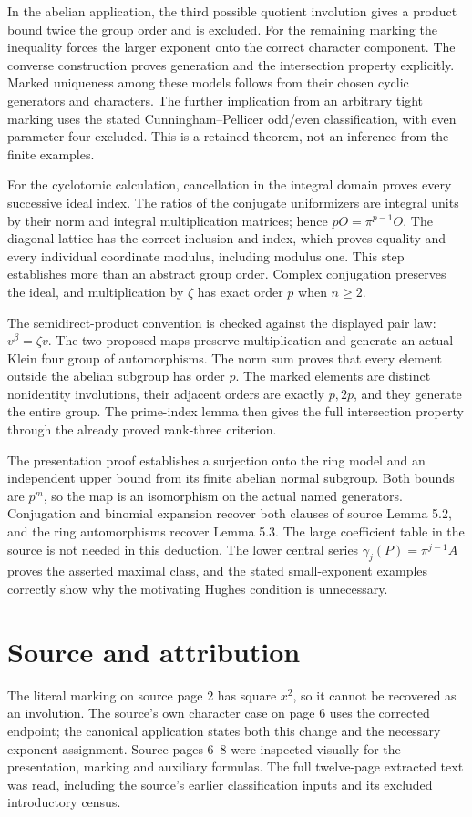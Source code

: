 \documentclass[11pt,a4paper]{article}
\begin{document}
In the abelian application, the third possible quotient involution gives a product bound twice the group order and is excluded. For the remaining marking the inequality forces the larger exponent onto the correct character component. The converse construction proves generation and the intersection property explicitly. Marked uniqueness among these models follows from their chosen cyclic generators and characters. The further implication from an arbitrary tight marking uses the stated Cunningham--Pellicer odd/even classification, with even parameter four excluded. This is a retained theorem, not an inference from the finite examples.

For the cyclotomic calculation, cancellation in the integral domain proves every successive ideal index. The ratios of the conjugate uniformizers are integral units by their norm and integral multiplication matrices; hence $pO=\pi^{p-1}O$. The diagonal lattice has the correct inclusion and index, which proves equality and every individual coordinate modulus, including modulus one. This step establishes more than an abstract group order. Complex conjugation preserves the ideal, and multiplication by $\zeta$ has exact order $p$ when $n\geq2$.

The semidirect-product convention is checked against the displayed pair law: $v^\beta=\zeta v$. The two proposed maps preserve multiplication and generate an actual Klein four group of automorphisms. The norm sum proves that every element outside the abelian subgroup has order $p$. The marked elements are distinct nonidentity involutions, their adjacent orders are exactly $p,2p$, and they generate the entire group. The prime-index lemma then gives the full intersection property through the already proved rank-three criterion.

The presentation proof establishes a surjection onto the ring model and an independent upper bound from its finite abelian normal subgroup. Both bounds are $p^m$, so the map is an isomorphism on the actual named generators. Conjugation and binomial expansion recover both clauses of source Lemma 5.2, and the ring automorphisms recover Lemma 5.3. The large coefficient table in the source is not needed in this deduction. The lower central series $\gamma_j(P)=\pi^{j-1}A$ proves the asserted maximal class, and the stated small-exponent examples correctly show why the motivating Hughes condition is unnecessary.

\section*{Source and attribution}
The literal marking on source page 2 has square $x^2$, so it cannot be recovered as an involution. The source's own character case on page 6 uses the corrected endpoint; the canonical application states both this change and the necessary exponent assignment. Source pages 6--8 were inspected visually for the presentation, marking and auxiliary formulas. The full twelve-page extracted text was read, including the source's earlier classification inputs and its excluded introductory census.
\end{document}
